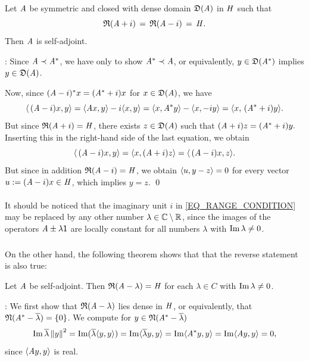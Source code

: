 \documentclass[11pt,twoside]{article}
\begin{document}
\begin{theorem}\label{RANGE_CONDITION1}
Let $\mathit{A}$ be symmetric and closed
with dense domain $\mathfrak{D}(\mathit{A})$ in $\mathit{H}$ such that
\begin{equation}\label{EQ_RANGE_CONDITION}
\mathfrak{R}(\mathit{A} + i) \,=\, \mathfrak{R}(\mathit{A} - i) \,=\, \mathit{H}.
\end{equation}
Then $\mathit{A}$ is self-adjoint.
\end{theorem}

\Proof:
Since $\mathit{A} \prec \mathit{A}^*$,
we have only to show $\mathit{A}^* \prec \mathit{A}$, or equivalently,
$y \in \mathfrak{D}(\mathit{A}^*)$ implies $y \in \mathfrak{D}(\mathit{A})$.

Now,
since $(\mathit{A}-i)^*x = (\mathit{A}^* +i)x$ for $x \in \mathfrak{D}(\mathit{A})$,
we have
\[
\langle \,(\mathit{A}-i)x,y \rangle = \langle \mathit{A} x,y \rangle -i\langle x,y \rangle =
\langle x,\mathit{A}^*y \rangle -\langle x,-iy \rangle = \langle x,\,(\mathit{A}^* +i)y \rangle.
\]
But since $\mathfrak{R}(\mathit{A}+i) = \mathit{H}$,
there exists $z \in \mathfrak{D}(\mathit{A})$ such that
$
(\mathit{A} + i)z = (\mathit{A}^* +i)y.
$
Inserting this in the right-hand side of the last equation, we obtain
\[
\langle \,(\mathit{A}-i)x,y \rangle = \langle x,(\mathit{A} + i)z \rangle = \langle \,(A-i)x,z \rangle.
\]
But since in addition $\mathfrak{R}(\mathit{A}-i) = \mathit{H}$, we obtain
$\langle u,y-z \rangle = 0$ for every vector $u := (\mathit{A}-i)x \in \mathit{H}$,
which implies $y=z$.
\qed

\paragraph{}
It should be noticed
that the imaginary unit $i$ in \eqref{EQ_RANGE_CONDITION}
may be replaced by any other number
$\lambda \in {\mathbb{C}} \setminus {\mathbb{R}}$,
since the images of the operators $\mathit{A} \pm \lambda {\mathsf{1}}$
are locally constant for all numbers $\lambda$ with $\operatorname{Im} \lambda \neq 0$.

\subparagraph{}
On the other hand,
the following theorem shows that that the reverse statement is also true:

\begin{theorem}\label{RANGE_CONDITION2}
Let $\mathit{A}$ be self-adjoint.
Then $\mathfrak{R}(\mathit{A} - \lambda) = \mathit{H}$ for each $\lambda \in C$ with
$\operatorname{Im} \lambda \neq 0$.
\end{theorem}

\Proof:
We first show that $\mathfrak{R}(\mathit{A} - \lambda)$ lies dense in $\mathit{H}$,
or equivalently, that $\mathfrak{N}(\mathit{A}^* - \overline{\lambda}) = \{0\}$.
We compute for $y \in \mathfrak{N}(\mathit{A}^* - \overline{\lambda})$
\[
\operatorname{Im} \overline{\lambda} \left\lVert y \right\rVert^2 =
\operatorname{Im} (\overline{\lambda} \langle y,y \rangle) =
\operatorname{Im} \langle \overline{\lambda}y,y \rangle =
\operatorname{Im} \langle \mathit{A}^* y,y \rangle =
\operatorname{Im} \langle \mathit{A} y,y \rangle = 0,
\]
since $\langle \mathit{A} y,y \rangle$ is real.
\end{document}
